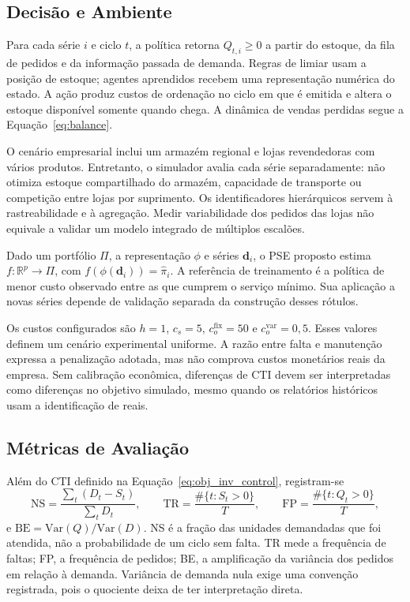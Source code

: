 \subsection{Decisão e Ambiente}
\label{sec:instanciacao_ambiente}

Para cada série $i$ e ciclo $t$, a política retorna $Q_{t,i}\geq0$ a partir do estoque, da fila de pedidos e da informação passada de demanda. Regras de limiar usam a posição de estoque; agentes aprendidos recebem uma representação numérica do estado. A ação produz custos de ordenação no ciclo em que é emitida e altera o estoque disponível somente quando chega. A dinâmica de vendas perdidas segue a Equação~\ref{eq:balance}.

O cenário empresarial inclui um armazém regional e lojas revendedoras com vários produtos. Entretanto, o simulador avalia cada série separadamente: não otimiza estoque compartilhado do armazém, capacidade de transporte ou competição entre lojas por suprimento. Os identificadores hierárquicos servem à rastreabilidade e à agregação. Medir variabilidade dos pedidos das lojas não equivale a validar um modelo integrado de múltiplos escalões.

\begin{defi}
Dado um portfólio $\Pi$, a representação $\phi$ e séries $\mathbf d_i$, o PSE proposto estima $f:\mathbb R^p\rightarrow\Pi$, com $f(\phi(\mathbf d_i))=\hat\pi_i$. A referência de treinamento é a política de menor custo observado entre as que cumprem o serviço mínimo. Sua aplicação a novas séries depende de validação separada da construção desses rótulos.
\end{defi}

Os custos configurados são $h=1$, $c_s=5$, $c_o^{\mathrm{fix}}=50$ e $c_o^{\mathrm{var}}=0{,}5$. Esses valores definem um cenário experimental uniforme. A razão entre falta e manutenção expressa a penalização adotada, mas não comprova custos monetários reais da empresa. Sem calibração econômica, diferenças de CTI devem ser interpretadas como diferenças no objetivo simulado, mesmo quando os relatórios históricos usam a identificação de reais.

\subsection{Métricas de Avaliação}
\label{sec:metricas_avaliacao}

Além do CTI definido na Equação~\ref{eq:obj_inv_control}, registram-se
\[
\mathrm{NS}=\frac{\sum_t(D_t-S_t)}{\sum_tD_t},\qquad
\mathrm{TR}=\frac{\#\{t:S_t>0\}}T,\qquad
\mathrm{FP}=\frac{\#\{t:Q_t>0\}}T,
\]
e $\mathrm{BE}=\mathrm{Var}(Q)/\mathrm{Var}(D)$. NS é a fração das unidades demandadas que foi atendida, não a probabilidade de um ciclo sem falta. TR mede a frequência de faltas; FP, a frequência de pedidos; BE, a amplificação da variância dos pedidos em relação à demanda. Variância de demanda nula exige uma convenção registrada, pois o quociente deixa de ter interpretação direta.

